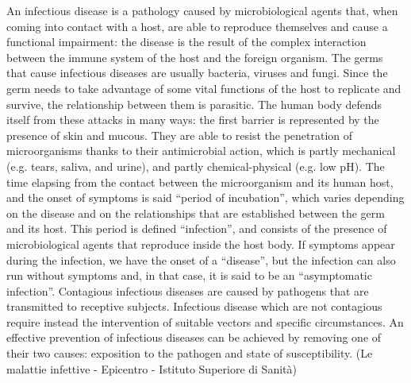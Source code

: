 \documentclass[11pt]{report}
\begin{document}
An infectious disease is a pathology caused by microbiological agents that, when coming into contact with a host, are able to reproduce themselves and cause a functional impairment: the disease is the result of the complex interaction between the immune system of the host and the foreign organism. The germs that cause infectious diseases are usually bacteria, viruses and fungi. Since the germ needs to take advantage of some vital functions of the host to replicate and survive, the relationship between them is parasitic.
The human body defends itself from these attacks in many ways: the first barrier is represented by the presence of skin and mucous. They are able to resist the penetration of microorganisms thanks to their antimicrobial action, which is partly mechanical (e.g. tears, saliva, and urine), and partly chemical-physical (e.g. low pH). The time elapsing from the contact between the microorganism and its human host, and the onset of symptoms is said “period of incubation”, which varies depending on the disease and on the relationships that are established between the germ and its host. This period is defined “infection”, and consists of the presence of microbiological agents that reproduce inside the host body.
If symptoms appear during the infection, we have the onset of a “disease”, but the infection can also run without symptoms and, in that case, it is said to be an “asymptomatic infection”.
Contagious infectious diseases are caused by pathogens that are transmitted to receptive subjects. Infectious disease which are not contagious require instead the intervention of suitable vectors and specific circumstances. An effective prevention of infectious diseases can be achieved by removing one of their two causes: exposition to the pathogen and state of susceptibility.
(Le malattie infettive - Epicentro - Istituto Superiore di Sanità)
\end{document}
